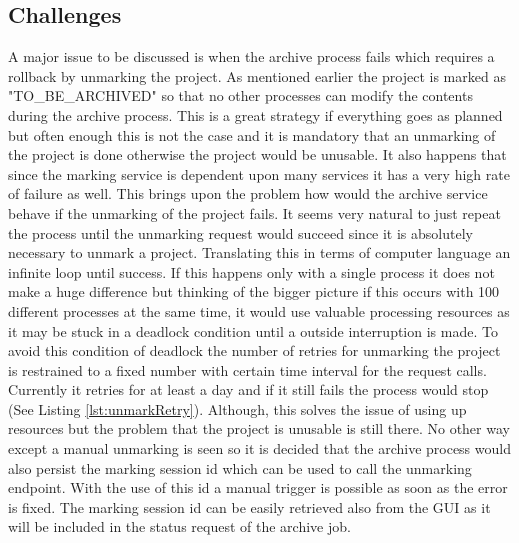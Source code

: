 \subsection{Challenges}

A major issue to be discussed is when the archive process fails which requires a rollback by unmarking the project. As mentioned earlier the project is
marked as "TO\_BE\_ARCHIVED" so that no other processes can modify the contents during the archive process. This is a great strategy if everything goes as planned but 
often enough this is not the case and it is mandatory that an unmarking of the project is done otherwise the project would be unusable. It also happens that since the
marking service is dependent upon many services it has a very high rate of failure as well. This brings upon the problem how would the archive service behave if the
unmarking of the project fails. It seems very natural to just repeat the process until the unmarking request would succeed since it is absolutely necessary to unmark
a project. 
Translating this in terms of computer 
language an infinite loop until success. If this happens only with a single process it does not make a huge difference but thinking of the bigger picture if this 
occurs with 100 different processes at the same time, it would use valuable processing resources as it may be stuck in a deadlock condition until a outside interruption
is made. To avoid this condition of deadlock the number of retries for unmarking the project is restrained to a fixed number with certain time interval for the request 
calls. Currently it retries for at least a day and if it still fails the process would stop 
(See Listing \ref{lst:unmarkRetry}). 
Although, this solves the issue of using up resources but the problem that the project is unusable is still there. No other way except a manual unmarking is seen so 
it is decided that the archive process would also persist the marking session id which can be used to call the unmarking endpoint. With the use of this id a manual 
trigger is possible as soon as the error is fixed. The marking session id can be easily retrieved also from the GUI as it will be included in the status request of
the archive job.


